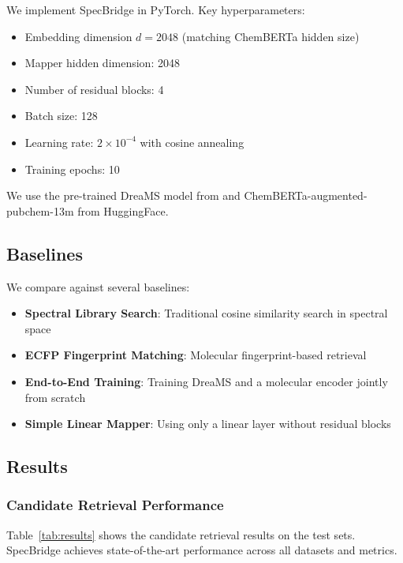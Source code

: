 \documentclass[11pt]{article}
\begin{document}
We implement SpecBridge in PyTorch. Key hyperparameters:

\begin{itemize}
    \item Embedding dimension $d = 2048$ (matching ChemBERTa hidden size)
    \item Mapper hidden dimension: 2048
    \item Number of residual blocks: 4
    \item Batch size: 128
    \item Learning rate: $2 \times 10^{-4}$ with cosine annealing
    \item Training epochs: 10
\end{itemize}

We use the pre-trained DreaMS model from \cite{bushuiev2025selfsupervised} and ChemBERTa-augmented-pubchem-13m from HuggingFace.

\subsection{Baselines}

We compare against several baselines:

\begin{itemize}
    \item \textbf{Spectral Library Search}: Traditional cosine similarity search in spectral space
    \item \textbf{ECFP Fingerprint Matching}: Molecular fingerprint-based retrieval
    \item \textbf{End-to-End Training}: Training DreaMS and a molecular encoder jointly from scratch
    \item \textbf{Simple Linear Mapper}: Using only a linear layer without residual blocks
\end{itemize}

\subsection{Results}

\subsubsection{Candidate Retrieval Performance}

Table~\ref{tab:results} shows the candidate retrieval results on the test sets. SpecBridge achieves state-of-the-art performance across all datasets and metrics.
\end{document}
